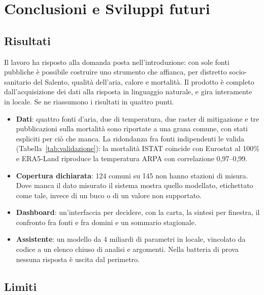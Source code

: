 \chapter{Conclusioni e Sviluppi futuri}
\label{cap:conclusioni}

\section{Risultati}

Il lavoro ha risposto alla domanda posta nell'introduzione: con sole fonti pubbliche è possibile costruire uno strumento che affianca, per distretto socio-sanitario del Salento, qualità dell'aria, calore e mortalità. Il prodotto è completo dall'acquisizione dei dati alla risposta in linguaggio naturale, e gira interamente in locale. Se ne riassumono i risultati in quattro punti.
\begin{itemize}
  \item \textbf{Dati}: quattro fonti d'aria, due di temperatura, due raster di mitigazione e tre pubblicazioni sulla mortalità sono riportate a una grana comune, con stati espliciti per ciò che manca. La ridondanza fra fonti indipendenti le valida (Tabella~\ref{tab:validazione}): la mortalità ISTAT coincide con Eurostat al 100\% e ERA5-Land riproduce la temperatura ARPA con correlazione 0,97--0,99.
  \item \textbf{Copertura dichiarata}: 124 comuni su 145 non hanno stazioni di misura. Dove manca il dato misurato il sistema mostra quello modellato, etichettato come tale, invece di un buco o di un valore non supportato.
  \item \textbf{Dashboard}: un'interfaccia per decidere, con la carta, la sintesi per finestra, il confronto fra fonti e fra domini e un sommario stagionale.
  \item \textbf{Assistente}: un modello da 4 miliardi di parametri in locale, vincolato da codice a un elenco chiuso di analisi e argomenti. Nella batteria di prova nessuna risposta è uscita dal perimetro.
\end{itemize}

\section{Limiti}


